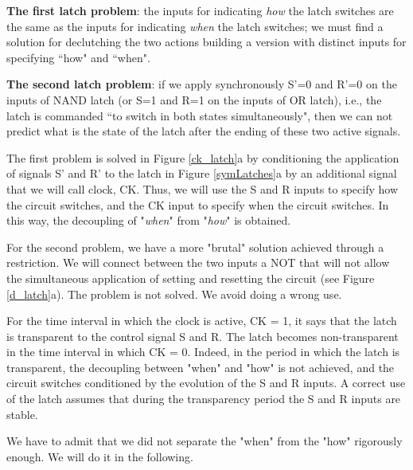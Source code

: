 {\bf The first latch problem}: the inputs for indicating
{\em how} the latch switches are the same as the inputs for
indicating {\em when} the latch switches; we must find a solution
for declutching the two actions   building a version  with
distinct inputs for specifying ``how" and ``when".

{\bf The second latch problem}: if we apply synchronously
S'=0 and R'=0 on the inputs of NAND latch  (or S=1 and R=1 on the
inputs of OR latch), i.e., the latch is commanded ``to switch in
both states simultaneously", then we can not predict what is the
state of the latch after the ending of these two active signals.

The first problem is solved in Figure \ref{ck_latch}a by conditioning the application of signals S' and R' to the latch in Figure \ref{symLatches}a by an additional signal that we will call clock, CK. Thus, we will use the S and R inputs to specify how the circuit switches, and the CK input to specify when the circuit switches. In this way, the decoupling of "{\em when}" from "{\em how}" is obtained.

For the second problem, we have a more "brutal" solution achieved through a restriction. We will connect between the two inputs a NOT that will not allow the simultaneous application of setting and resetting the circuit (see Figure \ref{d_latch}a). The problem is not solved. We avoid doing a wrong use.




For the time interval in which the clock is active, CK = 1, it says that the latch is transparent to the control signal S and R. The latch becomes non-transparent in the time interval in which CK = 0. Indeed, in the period in which the latch is transparent, the decoupling between "when" and "how" is not achieved, and the circuit switches conditioned by the evolution of the S and R inputs. A correct use of the latch assumes that during the transparency period the S and R inputs are stable.

We have to admit that we did not separate the "when" from the "how" rigorously enough. We will do it in the following.


